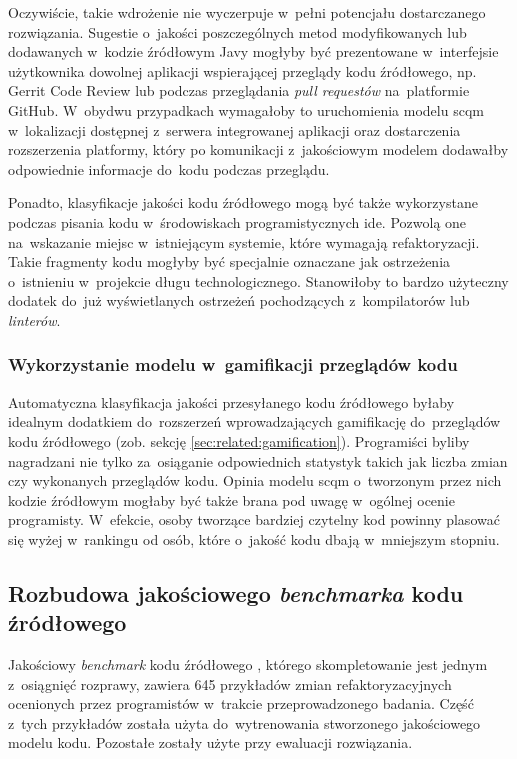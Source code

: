 \documentclass[twoside]{praca}
\begin{document}
Oczywiście, takie wdrożenie nie wyczerpuje w~pełni potencjału dostarczanego rozwiązania. Sugestie o~jakości poszczególnych metod modyfikowanych lub dodawanych w~kodzie źródłowym Javy mogłyby być prezentowane w~interfejsie użytkownika dowolnej aplikacji wspierającej przeglądy kodu źródłowego, np. Gerrit Code Review lub podczas przeglądania \textit{pull requestów} na~platformie GitHub. W~obydwu przypadkach wymagałoby to uruchomienia modelu \gls{scqm} w~lokalizacji dostępnej z~serwera integrowanej aplikacji oraz dostarczenia rozszerzenia platformy, który po komunikacji z~jakościowym modelem dodawałby odpowiednie informacje do~kodu podczas przeglądu.

Ponadto, klasyfikacje jakości kodu źródłowego mogą być także wykorzystane podczas pisania kodu w~środowiskach programistycznych \gls{ide}. Pozwolą one na~wskazanie miejsc w~istniejącym systemie, które wymagają refaktoryzacji. Takie fragmenty kodu mogłyby być specjalnie oznaczane jak ostrzeżenia o~istnieniu w~projekcie długu technologicznego. Stanowiłoby to bardzo użyteczny dodatek do~już wyświetlanych ostrzeżeń pochodzących z~kompilatorów lub \textit{linterów}.

\subsubsection{Wykorzystanie modelu w~gamifikacji przeglądów kodu}
Automatyczna klasyfikacja jakości przesyłanego kodu źródłowego byłaby idealnym dodatkiem do~rozszerzeń wprowadzających gamifikację do~przeglądów kodu źródłowego (zob. sekcję \ref{sec:related:gamification}). Programiści byliby nagradzani nie tylko za~osiąganie odpowiednich statystyk takich jak liczba zmian czy wykonanych przeglądów kodu. Opinia modelu \gls{scqm} o~tworzonym przez nich kodzie źródłowym mogłaby być także brana pod uwagę w~ogólnej ocenie programisty. W~efekcie, osoby tworzące bardziej czytelny kod powinny plasować się wyżej w~rankingu od osób, które o~jakość kodu dbają w~mniejszym stopniu.

\subsection{Rozbudowa jakościowego \textit{benchmarka} kodu źródłowego}

Jakościowy \textit{benchmark} kodu źródłowego \cite{fracz:benchmark}, którego skompletowanie jest jednym z~osiągnięć rozprawy, zawiera 645 przykładów zmian refaktoryzacyjnych ocenionych przez programistów w~trakcie przeprowadzonego badania. Część z~tych przykładów została użyta do~wytrenowania stworzonego jakościowego modelu kodu. Pozostałe zostały użyte przy ewaluacji rozwiązania.
\end{document}

